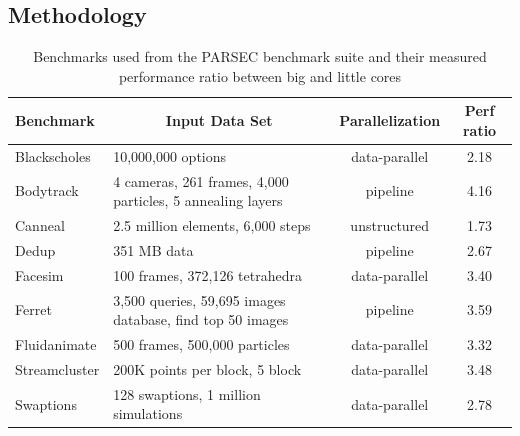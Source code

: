 \subsection{Methodology}

\begin{table}[!t]
	\centering
	\scriptsize
	\caption{Benchmarks used from the PARSEC benchmark suite and their 
		measured performance ratio between big and little cores}
	\setlength{\tabcolsep}{3pt}
	\begin{tabular}{|p{2cm}|p{5cm}|c|c|}
		\hline
		\textbf{Benchmark} & \multicolumn{1}{|c|}{\textbf{Input Data Set}} & \textbf{Parallelization} & \multicolumn{1}{|c|}{\textbf{Perf ratio}} \\
		\hline \hline
		Blackscholes & 10,000,000 options & data-parallel &2.18 \\ \hline
		Bodytrack & 4 cameras, 261 frames, 4,000 particles, 5 annealing layers & pipeline & 4.16 \\ \hline
		Canneal & 2.5 million elements, 6,000 steps & unstructured & 1.73 \\ \hline
		Dedup & 351 MB data & pipeline & 2.67 \\ \hline
		Facesim & 100 frames, 372,126 tetrahedra & data-parallel & 3.40 \\ \hline
		Ferret & 3,500 queries, 59,695 images database, find top 50 images & pipeline & 3.59 \\ \hline
		Fluidanimate & 500 frames, 500,000 particles & data-parallel & 3.32 \\ \hline
		Streamcluster & 200K points per block, 5 block & data-parallel & 3.48 \\ \hline
		Swaptions & 128 swaptions, 1 million  simulations & data-parallel & 2.78 \\ \hline
	\end{tabular}
	\label{tab.AMC.apps}
\end{table}


